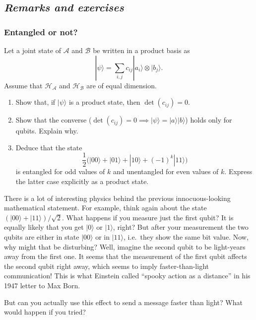 \documentclass[fleqn]{article}
\begin{document}
\hypertarget{remarks-and-exercises-entanglement}{%
\subsection{\texorpdfstring{\emph{Remarks and exercises}}{Remarks and exercises}}\label{remarks-and-exercises-entanglement}}

\hypertarget{entangled-or-not}{%
\subsubsection{Entangled or not?}\label{entangled-or-not}}

Let a joint state of \(\mathcal{A}\) and \(\mathcal{B}\) be written in a product basis as
\[
  |\psi\rangle = \sum_{i,j} c_{ij}|a_i\rangle\otimes|b_j\rangle.
\]
Assume that \(\mathcal{H}_{\mathcal{A}}\) and \(\mathcal{H}_{\mathcal{B}}\) are of equal dimension.

\begin{enumerate}
\def\labelenumi{\arabic{enumi}.}
\item
  Show that, if \(|\psi\rangle\) is a product state, then \(\det (c_{ij}) = 0\).
\item
  Show that the converse (\(\det(c_{ij})=0\implies|\psi\rangle=|a\rangle|b\rangle\)) holds only for qubits. Explain why.
\item
  Deduce that the state
  \[
     \frac{1}{2}\big(|00\rangle + |01\rangle + |10\rangle + (-1)^k|11\rangle\big)
   \]
  is entangled for odd values of \(k\) and unentangled for even values of \(k\). Express the latter case explicitly as a product state.
\end{enumerate}

There is a lot of interesting physics behind the previous innocuous-looking mathematical statement.
For example, think again about the state \((|00\rangle+|11\rangle)/\sqrt{2}\).
What happens if you measure just the first qubit?
It is equally likely that you get \(|0\rangle\) or \(|1\rangle\), right?
But after your measurement the two qubits are either in state \(|00\rangle\) or in \(|11\rangle\), i.e.~they show the same bit value.
Now, why might that be disturbing?
Well, imagine the second qubit to be light-years away from the first one.
It seems that the measurement of the first qubit affects the second qubit right away, which seems to imply faster-than-light communication!
This is what Einstein called ``spooky action as a distance'' in his 1947 letter to Max Born.

But can you actually use this effect to send a message faster than light?
What would happen if you tried?
\end{document}

